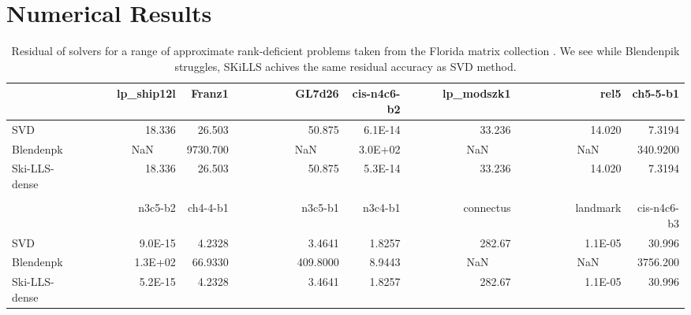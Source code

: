 \documentclass[english,11pt]{article}
\begin{document}
\appendix

\section{Numerical Results}
\begin{table}[H]
\scriptsize
\centering
\begin{tabular}{l|rrrrrrr}
               & lp\_ship12l                          & Franz1               & GL7d26                                & cis-n4c6-b2          & lp\_modszk1                           & rel5                                  & ch5-5-b1              \\ 
\hline
SVD          & 18.336                               & 26.503               & 50.875                                & 6.1E-14              & 33.236                                & 14.020                                & 7.3194                \\
Blendenpk      & \multicolumn{1}{l}{~~~~~~~~~NaN~~~~} & 9730.700             & \multicolumn{1}{l}{~~~~~~~~~~NaN~~~~} & 3.0E+02              & \multicolumn{1}{l}{~~~~~~~~~~NaN~~~~} & \multicolumn{1}{l}{~~~~~~~~~~NaN~~~~} & 340.9200              \\
Ski-LLS-dense  & 18.336                               & 26.503               & 50.875                                & 5.3E-14              & 33.236                                & 14.020                                & 7.3194                \\
               & \multicolumn{1}{l}{}                 & \multicolumn{1}{l}{} & \multicolumn{1}{l}{}                  & \multicolumn{1}{l}{} & \multicolumn{1}{l}{}                  & \multicolumn{1}{l}{}                  & \multicolumn{1}{l}{}  \\
               & n3c5-b2                              & ch4-4-b1             & n3c5-b1                               & n3c4-b1              & connectus                             & landmark                              & cis-n4c6-b3           \\ 
\hline
SVD            & 9.0E-15                              & 4.2328               & 3.4641                                & 1.8257               & 282.67                                & 1.1E-05                               & 30.996                \\
Blendenpk      & 1.3E+02                              & 66.9330              & 409.8000                              & 8.9443               & \multicolumn{1}{l}{~~~~~~~~~~NaN~~~~} & \multicolumn{1}{l}{~~~~~~~~~~NaN~~~~} & 3756.200              \\
Ski-LLS-dense  & 5.2E-15                              & 4.2328               & 3.4641                                & 1.8257               & 282.67                                & 1.1E-05                               & 30.996               
\end{tabular}
\caption{Residual of solvers for a range of approximate rank-deficient problems taken from the Florida matrix collection \cite{10.1145/2049662.2049663}. We see while Blendenpik struggles, SKiLLS achives the same residual accuracy as SVD method.}
\label{tab::rank_def_accuracy}
\end{table}
\end{document}

